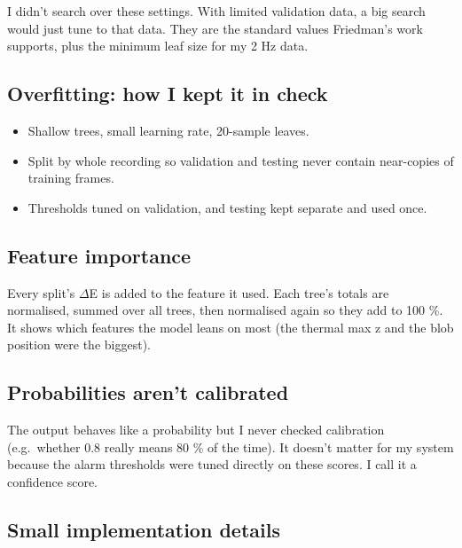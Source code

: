\documentclass[11pt,a4paper]{article}
\providecommand{\tightlist}{\setlength{\itemsep}{0pt}\setlength{\parskip}{0pt}}
\begin{document}
I didn't search over these
settings. With limited
validation data, a big search
would just tune to that data.
They are the standard values
Friedman's work supports, plus
the minimum leaf size for my 2
Hz data.

\hypertarget{overfitting-how-i-kept-it-in-check}{%
\subsection{Overfitting: how I
kept it in
check}\label{overfitting-how-i-kept-it-in-check}}

\begin{itemize}
\tightlist
\item
  Shallow trees, small
  learning rate, 20-sample
  leaves.
\item
  Split by whole recording so
  validation and testing never
  contain near-copies of
  training frames.
\item
  Thresholds tuned on
  validation, and testing kept
  separate and used once.
\end{itemize}

\hypertarget{feature-importance}{%
\subsection{Feature
importance}\label{feature-importance}}

Every split's $\Delta$E is added to
the feature it used. Each
tree's totals are normalised,
summed over all trees, then
normalised again so they add
to 100 \%. It shows which
features the model leans on
most (the thermal max z and
the blob position were the
biggest).

\hypertarget{probabilities-arent-calibrated}{%
\subsection{Probabilities
aren't
calibrated}\label{probabilities-arent-calibrated}}

The output behaves like a
probability but I never
checked calibration
(e.g.~whether 0.8 really means
80 \% of the time). It doesn't
matter for my system because
the alarm thresholds were
tuned directly on these
scores. I call it a confidence
score.

\hypertarget{small-implementation-details}{%
\subsection{Small
implementation
details}\label{small-implementation-details}}
\end{document}
